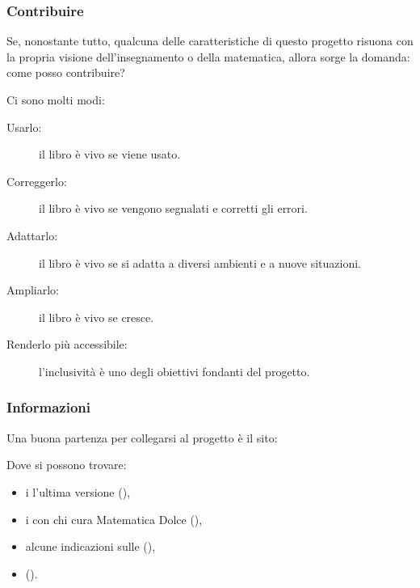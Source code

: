 \documentclass{beamer} %
\begin{document}
\begin{frame}\frametitle{Contribuire}

Se, nonostante tutto, qualcuna delle caratteristiche di questo progetto 
risuona con la propria visione dell'insegnamento o della matematica, allora 
sorge la domanda: come posso contribuire?

\vspace{1em}
Ci sono molti modi:
\spause
\begin{description}
\item [Usarlo:\hspace{10.3mm}] il libro è vivo se viene usato.
\item [Correggerlo: ] il libro è vivo se vengono segnalati e corretti gli 
errori.
\item [Adattarlo:\hspace{4mm} ] il libro è vivo se si adatta a diversi 
ambienti e a nuove situazioni.
\item [Ampliarlo:\hspace{3mm} ] il libro è vivo se cresce.
\item [Renderlo più accessibile: ] l'inclusività è uno degli obiettivi 
fondanti del progetto.
\end{description}

\end{frame}


\begin{frame}\frametitle{Informazioni}

Una buona partenza per collegarsi al progetto è il sito:

\bigskip
\begin{center}
\href{https://www.matematicadolce.eu}
     {{\huge {}}}
\end{center}

\bigskip
Dove si possono trovare:
\begin{itemize}
\item i  l'ultima versione 
(),
\item i  con chi cura Matematica Dolce
(),
\item alcune indicazioni sulle 
(),
\item {}
().
\end{itemize}

\spause
\begin{center}  \end{center}



\end{frame}
\end{document}

